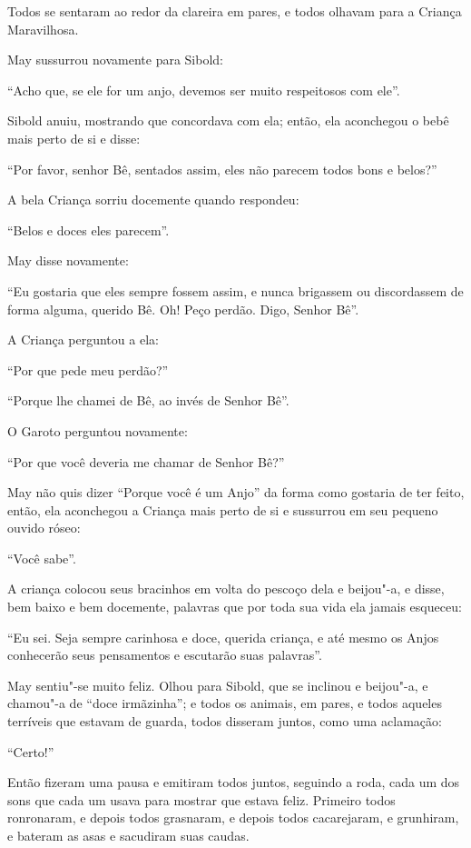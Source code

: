 Todos se sentaram ao redor da clareira em pares, e todos olhavam para a
Criança Maravilhosa.

May sussurrou novamente para Sibold:

``Acho que, se ele for um anjo, devemos ser muito respeitosos com ele''.

Sibold anuiu, mostrando que concordava com ela; então, ela aconchegou o
bebê mais perto de si e disse:

``Por favor, senhor Bê, sentados assim, eles não parecem todos bons e
belos?''

A bela Criança sorriu docemente quando respondeu:

``Belos e doces eles parecem''.

May disse novamente:

``Eu gostaria que eles sempre fossem assim, e nunca brigassem ou
discordassem de forma alguma, querido Bê. Oh! Peço perdão. Digo, Senhor
Bê''.

A Criança perguntou a ela:

``Por que pede meu perdão?''

``Porque lhe chamei de Bê, ao invés de Senhor Bê''.

O Garoto perguntou novamente:

``Por que você deveria me chamar de Senhor Bê?''

May não quis dizer ``Porque você é um Anjo'' da forma como gostaria de
ter feito, então, ela aconchegou a Criança mais perto de si e sussurrou
em seu pequeno ouvido róseo:

``Você sabe''.

A criança colocou seus bracinhos em volta do pescoço dela e beijou"-a, e
disse, bem baixo e bem docemente, palavras que por toda sua vida ela
jamais esqueceu:

``Eu sei. Seja sempre carinhosa e doce, querida criança, e até mesmo os
Anjos conhecerão seus pensamentos e escutarão suas palavras''.

May sentiu"-se muito feliz. Olhou para Sibold, que se inclinou e
beijou"-a, e chamou"-a de ``doce irmãzinha''; e todos os animais, em
pares, e todos aqueles terríveis que estavam de guarda, todos disseram
juntos, como uma aclamação:

``Certo!''

Então fizeram uma pausa e emitiram todos juntos, seguindo a roda, cada
um dos sons que cada um usava para mostrar que estava feliz. Primeiro
todos ronronaram, e depois todos grasnaram, e depois todos cacarejaram,
e grunhiram, e bateram as asas e sacudiram suas caudas.


